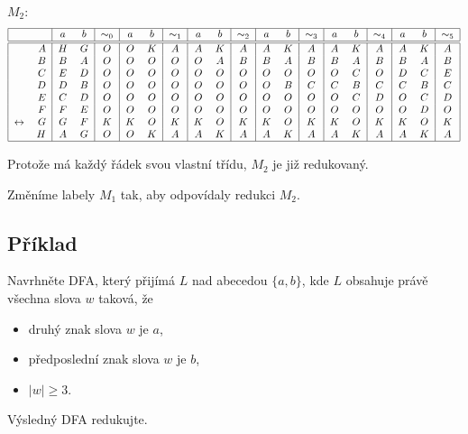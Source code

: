$M_2$:
\[
\begin{tabular}{|r r|c c|c|c c|c|c c|c|c c|c|c c|c|c c|c|}
    \hline
    & & $a$ & $b$ & $\sim_0$ & $a$ & $b$ & $\sim_1$ & $a$ & $b$ & $\sim_2$ & $a$ & $b$ & $\sim_3$ & $a$ & $b$ & $\sim_4$ & $a$ & $b$ & $\sim_5$\\
    \hline
    \hline
                     & $A$ &$H$ &$G$ &$O$ &$O$ &$K$ &$A$ &$A$ &$K$ &$A$ &$A$ &$K$ &$A$ &$A$ &$K$ &$A$ &$A$ &$K$ &$A$\\
                     & $B$ &$B$ &$A$ &$O$ &$O$ &$O$ &$O$ &$O$ &$A$ &$B$ &$B$ &$A$ &$B$ &$B$ &$A$ &$B$ &$B$ &$A$ &$B$\\
                     & $C$ &$E$ &$D$ &$O$ &$O$ &$O$ &$O$ &$O$ &$O$ &$O$ &$O$ &$O$ &$O$ &$O$ &$C$ &$O$ &$D$ &$C$ &$E$\\
                     & $D$ &$D$ &$B$ &$O$ &$O$ &$O$ &$O$ &$O$ &$O$ &$O$ &$O$ &$B$ &$C$ &$C$ &$B$ &$C$ &$C$ &$B$ &$C$\\
                     & $E$ &$C$ &$D$ &$O$ &$O$ &$O$ &$O$ &$O$ &$O$ &$O$ &$O$ &$O$ &$O$ &$O$ &$C$ &$D$ &$O$ &$C$ &$D$\\
                     & $F$ &$F$ &$E$ &$O$ &$O$ &$O$ &$O$ &$O$ &$O$ &$O$ &$O$ &$O$ &$O$ &$O$ &$O$ &$O$ &$O$ &$D$ &$O$\\
    $\leftrightarrow$& $G$ &$G$ &$F$ &$K$ &$K$ &$O$ &$K$ &$K$ &$O$ &$K$ &$K$ &$O$ &$K$ &$K$ &$O$ &$K$ &$K$ &$O$ &$K$\\
                     & $H$ &$A$ &$G$ &$O$ &$O$ &$K$ &$A$ &$A$ &$K$ &$A$ &$A$ &$K$ &$A$ &$A$ &$K$ &$A$ &$A$ &$K$ &$A$\\
    \hline
\end{tabular}
\]

Protože má každý řádek svou vlastní třídu, $M_2$ je již redukovaný.

Změníme labely $M_1$ tak, aby odpovídaly redukci $M_2$.


\subsection{Příklad}
Navrhněte DFA, který přijímá $L$ nad abecedou $\{a,b\}$, kde $L$ obsahuje právě všechna slova $w$ taková, že
\begin{itemize}[noitemsep]
    \item druhý znak slova $w$ je $a$,
    \item předposlední znak slova $w$ je $b$,
    \item $|w| \geq 3$.
\end{itemize}
Výsledný DFA redukujte.

